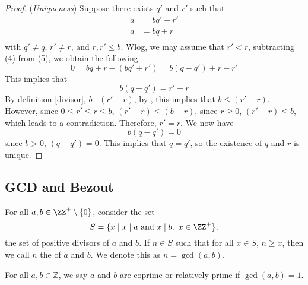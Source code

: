 \begin{proof}
    (\textit{Uniqueness}) Suppose there exists $q'$ and $r'$ such that
    \begin{equation}
        \begin{aligned}
            a&=bq'+r'\\
            a&=bq+r\\
        \end{aligned}
    \end{equation}
    with $q'\neq q$, $r' \neq r$, and $r, r' \leq b$. Wlog, we may assume that $r' < r$, subtracting (4) from (5), we obtain the following
    \begin{equation}
        0=bq+r-(bq'+r')=b(q-q')+r-r'
    \end{equation}
    This implies that
    \begin{equation}
        b(q-q')=r'-r
    \end{equation}
    By definition \ref{divisor}, $b \mid (r'-r)$, by , this implies that $b\leq (r'-r)$. However, since $0 \leq r' \leq r \leq b$, $(r'-r) \leq (b-r)$, since $r \geq 0$, $(r'-r) \leq b$, which leads to a contradiction. Therefore, $r'=r$. We now have
\begin{equation}
    b(q-q')=0
\end{equation}
since $b>0$, $(q-q')=0$. This implies that $q=q'$, so the existence of $q$ and $r$ is unique.
\end{proof}

\subsection{GCD and Bezout}


\begin{definition}\label{def_GCD}

For all $a, b \in \ZZ^+ \setminus \{0\}$, consider the set 
\begin{equation*}
S = \{ x \mid x \mid a \text{ and } x \mid b ,\  x \in \ZZ^+ \},
\end{equation*}
the set of positive divisors of $a$ and $b$. If $n \in S$ such that for all $x\in S$, $n\geq x$, then we call $n$ the  of $a$ and $b$. We denote this as $n = \gcd(a, b)$.
\end{definition}

\begin{definition} 
 For all $a, b \in \mathbb{Z}$, we say $a$ and $b$ are coprime or relatively prime if $\gcd(a, b) = 1$.
\end{definition}


